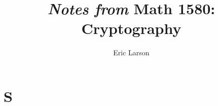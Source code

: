 \documentclass[]{jiahua}
\title{\textit{Notes from} Math 1580: Cryptography}
\author{Eric Larson}
\begin{document}
    \section{S}
\end{document}

